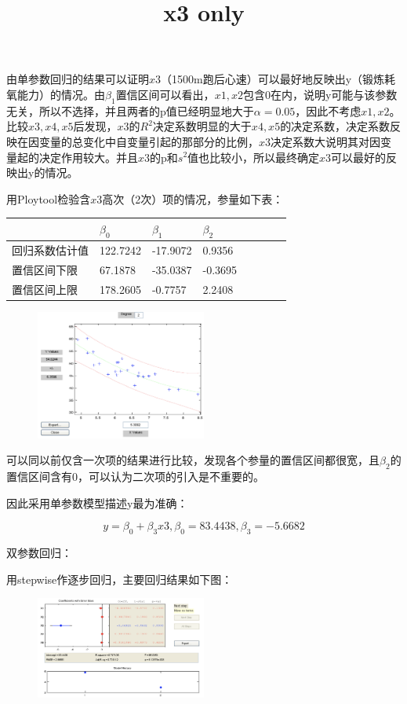 \documentclass{article}
\begin{document}
由单参数回归的结果可以证明$x3$（1500m跑后心速）可以最好地反映出y（锻炼耗氧能力）的情况。由$\beta_1$置信区间可以看出，$x1,x2$包含0在内，说明y可能与该参数无关，所以不选择，并且两者的p值已经明显地大于$\alpha=0.05$，因此不考虑$x1,x2$。比较$x3,x4,x5$后发现，$x3$的$R^2$决定系数明显的大于$x4,x5$的决定系数，决定系数反映在因变量的总变化中自变量引起的那部分的比例，$x3$决定系数大说明其对因变量起的决定作用较大。并且$x3$的p和$s^2$值也比较小，所以最终确定$x3$可以最好的反映出y的情况。

用Ploytool检验含$x3$高次（2次）项的情况，参量如下表：

\begin{table}[H]
\centering
\begin{tabular}{|l|l|l|l|l|l|l|l|}
\hline
&$\beta_0$&$\beta_1$&$\beta_2$\\ \hline
回归系数估计值 & 122.7242 & -17.9072 & 0.9356\\ \hline
置信区间下限 & 67.1878 & -35.0387  & -0.3695\\ \hline
置信区间上限 & 178.2605 & -0.7757 & 2.2408\\ \hline

\end{tabular}
\end{table}
\begin{figure}[H]
    \centering
    \includegraphics[width=0.5\textwidth]{pic2.png}
\end{figure}

可以同以前仅含一次项的结果进行比较，发现各个参量的置信区间都很宽，且$\beta_2$的置信区间含有0，可以认为二次项的引入是不重要的。

因此采用单参数模型描述y最为准确：

$$y=\beta_0+\beta_3x3, \beta_0=83.4438,\beta_3=-5.6682$$

双参数回归：

用stepwise作逐步回归，主要回归结果如下图：

\begin{figure}[H]
    \centering
    \includegraphics[width=0.5\textwidth]{pic3.png}
    \title{x3 only}
\end{figure}
\end{document}
